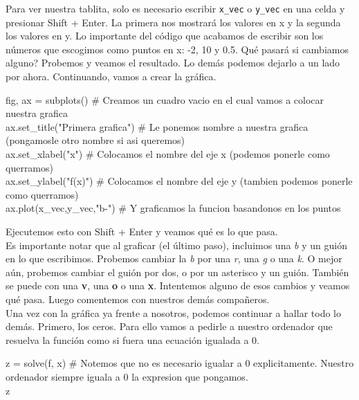 \documentclass[10pt,letterpaper]{article}
\newcommand{\inlinecode}[1]{
\colorbox{light-gray}{\texttt{#1}}
}
\newenvironment{Code}
{
\begin{lrbox}{\selvestebox}%
\begin{minipage}{\dimexpr\columnwidth-2\fboxsep\relax}
\fontfamily{\ttdefault}\selectfont
}
{\end{minipage}\end{lrbox}%
\begin{center}
\colorbox{light-gray}{\usebox{\selvestebox}}
\end{center}
}
\begin{document}
Para ver nuestra tablita, solo es necesario escribir \inlinecode{x\_vec} o \inlinecode{y\_vec} en una celda y presionar Shift + Enter. La primera nos mostrar\'a los valores en x y la segunda los valores en y. Lo importante del c\'odigo que acabamos de escribir son los n\'umeros que escogimos como puntos en x: -2, 10 y 0.5. Qu\'e pasar\'a si cambiamos alguno? Probemos y veamos el resultado. Lo dem\'as podemos dejarlo a un lado por ahora. Continuando, vamos a crear la gr\'afica.

\begin{footnotesize}
\begin{Code}
fig, ax = subplots() \# Creamos un cuadro vacio en el cual vamos a colocar nuestra grafica\\
ax.set\_title("Primera grafica") \# Le ponemos nombre a nuestra grafica (pongamosle otro nombre si asi queremos)\\
ax.set\_xlabel("x") \# Colocamos el nombre del eje x (podemos ponerle como querramos)\\
ax.set\_ylabel("f(x)") \# Colocamos el nombre del eje y (tambien podemos ponerle como querramos)\\
ax.plot(x\_vec,y\_vec,"b-") \# Y graficamos la funcion basandonos en los puntos
\end{Code}
\end{footnotesize}

Ejecutemos esto con Shift + Enter y veamos qu\'e es lo que pasa.\\

Es importante notar que al graficar (el \'ultimo paso), incluimos una \emph{b} y un gui\'on en lo que escribimos. Probemos cambiar la \emph{b} por una \emph{r}, una \emph{g} o una \emph{k}. O mejor a\'un, probemos cambiar el gui\'on por dos, o por un asterisco y un gui\'on. Tambi\'en se puede con una \textbf{v}, una \textbf{o} o una \textbf{x}. Intentemos alguno de esos cambios y veamos qu\'e pasa. Luego comentemos con nuestros dem\'as compa\~neros.\\

Una vez con la gr\'afica ya frente a nosotros, podemos continuar a hallar todo lo dem\'as. Primero, los ceros. Para ello vamos a pedirle a nuestro ordenador que resuelva la funci\'on como si fuera una ecuaci\'on igualada a 0.

\begin{footnotesize}
\begin{Code}
z = solve(f, x) \# Notemos que no es necesario igualar a 0 explicitamente. Nuestro ordenador siempre iguala a 0 la expresion que pongamos.\\
z
\end{Code}
\end{footnotesize}
\end{document}
